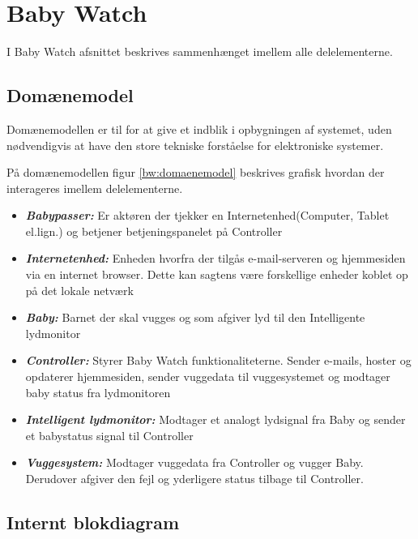 \chapter{Baby Watch}

I Baby Watch afsnittet beskrives sammenhænget imellem alle delelementerne.

\section{Domænemodel}

Domænemodellen er til for at give et indblik i opbygningen af systemet, uden nødvendigvis at have den store tekniske forståelse for elektroniske systemer.


På domænemodellen figur \ref{bw:domaenemodel} beskrives grafisk hvordan der interageres imellem delelementerne. 

\begin{itemize}
\item \textbf{\textit{Babypasser:}}
Er aktøren der tjekker en Internetenhed(Computer, Tablet el.lign.) og betjener betjeningspanelet på Controller 
\item \textbf{\textit{Internetenhed:}}
Enheden hvorfra der tilgås e-mail-serveren og hjemmesiden via en internet browser. Dette kan sagtens være forskellige enheder koblet op på det lokale netværk
\item \textbf{\textit{Baby:}}
Barnet der skal vugges og som afgiver lyd til den Intelligente lydmonitor
\item \textbf{\textit{Controller:}}
Styrer Baby Watch funktionaliteterne. Sender e-mails, hoster og opdaterer hjemmesiden, sender vuggedata til vuggesystemet og modtager baby status fra lydmonitoren
\item \textbf{\textit{Intelligent lydmonitor:}}
Modtager et analogt lydsignal fra Baby og sender et babystatus signal til Controller
\item \textbf{\textit{Vuggesystem:}}
Modtager vuggedata fra Controller og vugger Baby. Derudover afgiver den fejl og yderligere status tilbage til Controller.
\end{itemize}

\section{Internt blokdiagram}

